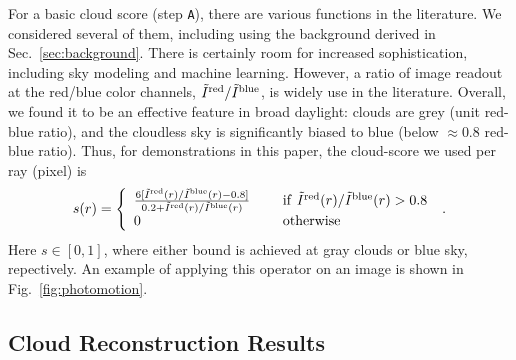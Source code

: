 \documentclass[runningheads]{llncs}
\begin{document}
For a basic cloud score (step {\tt A}), there are various functions in the literature. We considered several of them, including using the background derived in Sec.~\ref{sec:background}. There is certainly room for increased sophistication, including sky modeling and machine learning. However,
a ratio of image readout at the red/blue color channels, $\tilde I^{\rm red}/\tilde I^{\rm blue}$, is widely use in the literature. Overall, we found it to be an effective feature in broad daylight: clouds are grey (unit red-blue ratio), and the cloudless sky is significantly biased to blue
(below $\approx 0.8$ red-blue ratio). Thus, for demonstrations in this paper,
the cloud-score we used per ray (pixel) is
\begin{equation}
 s(r)=\left\{
      \begin{array}{ll}
      \frac{6 [\tilde I^{\rm red}(r)/\tilde I^{\rm blue}(r)-0.8]}
           {0.2+\tilde I^{\rm red}(r)/\tilde I^{\rm blue}(r)}
      & ~~~~{\rm if}~ \tilde I^{\rm red}(r)/\tilde I^{\rm blue}(r)>0.8 \\
      0
      & ~~~~{\rm otherwise}
      \end{array}
      \right.
  \;.
 \label{eq:sr}
\end{equation}
Here $s\in[0,1]$, where either bound is achieved at gray clouds or blue sky, repectively. An example of applying this operator on an image is shown in Fig.~\ref{fig:photomotion}.


\subsection*{Cloud Reconstruction Results}
\label{sec:results}
\end{document}
